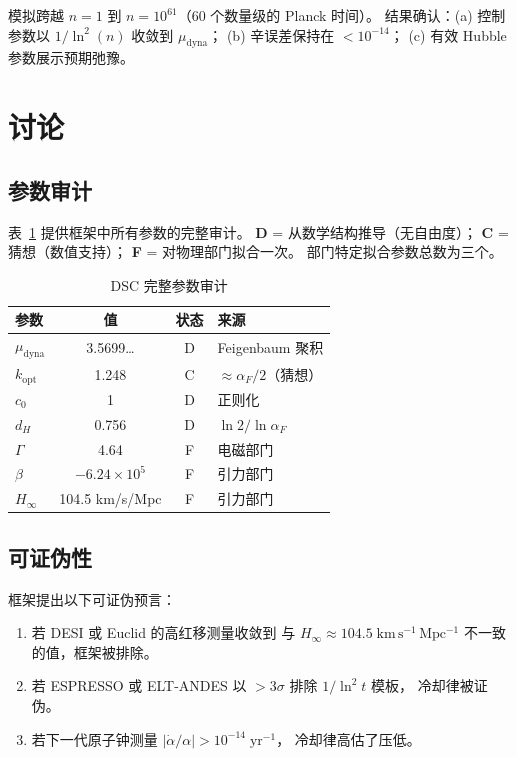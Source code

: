 \documentclass[a4paper,11pt]{article}
\theoremstyle{plain}
\newcommand{\lnq}{\ln^2}
\newcommand{\Hinf}{H_{\infty}}
\begin{document}
模拟跨越 $n = 1$ 到 $n = 10^{61}$（60 个数量级的 Planck 时间）。
结果确认：(a) 控制参数以 $1/\lnq(n)$ 收敛到 $\mu_{\mathrm{dyna}}$；
(b) 辛误差保持在 $< 10^{-14}$；
(c) 有效 Hubble 参数展示预期弛豫。

\section{讨论}\label{sec:discussion}

\subsection{参数审计}

表~\ref{tab:params} 提供框架中所有参数的完整审计。
\textbf{D} = 从数学结构推导（无自由度）；
\textbf{C} = 猜想（数值支持）；
\textbf{F} = 对物理部门拟合一次。
部门特定拟合参数总数为三个。

\begin{table}[h]
\centering
\caption{DSC 完整参数审计}
\label{tab:params}
\begin{tabular}{lccl}
\toprule
参数 & 值 & 状态 & 来源 \\
\midrule
$\mu_{\mathrm{dyna}}$ & 3.5699\ldots & D & Feigenbaum 聚积 \\
$k_{\mathrm{opt}}$ & 1.248 & C & $\approx\alpha_F/2$（猜想）\\
$c_0$ & 1 & D & 正则化 \\
$d_H$ & 0.756 & D & $\ln 2/\ln\alpha_F$ \\
$\Gamma$ & 4.64 & F & 电磁部门 \\
$\beta$ & $-6.24\times10^5$ & F & 引力部门 \\
$\Hinf$ & 104.5 km/s/Mpc & F & 引力部门 \\
\bottomrule
\end{tabular}
\end{table}

\subsection{可证伪性}

框架提出以下可证伪预言：
\begin{enumerate}
  \item 若 DESI 或 Euclid 的高红移测量收敛到
    与 $\Hinf \approx 104.5\;\mathrm{km\,s^{-1}\,Mpc^{-1}}$ 不一致的值，框架被排除。
  \item 若 ESPRESSO 或 ELT-ANDES 以 $>3\sigma$ 排除 $1/\lnq t$ 模板，
    冷却律被证伪。
  \item 若下一代原子钟测量
    $|\dot\alpha/\alpha| > 10^{-14}\;\mathrm{yr}^{-1}$，
    冷却律高估了压低。
\end{enumerate}
\end{document}
